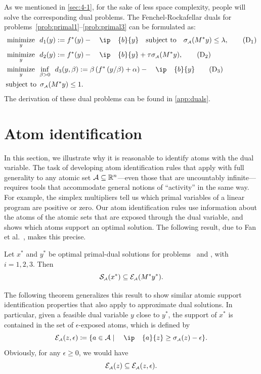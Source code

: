 As we mentioned in \autoref{sec:4-1}, for the sake of less space complexity, people will solve the corresponding dual problems. The Fenchel-Rockafellar duals for problems~\eqref{prob:primal1}--\eqref{prob:primal3} can be formulated as:
\begin{align} 
  & \minimize{y}  d_1(y) := f^*(y) - \ip{b}{y} \text{subject to} \sigma\As(M^*y) \leq \lambda, \label{prob:dual1} \tag{D$_1$}\\
  & \minimize{y} d_2(y) := f^*(y) - \ip{b}{y} + \tau\sigma\As(M^*y), \label{prob:dual2} \tag{D$_2$}\\
  & \minimize{y} \inf_{\beta > 0} \enspace d_3(y, \beta)
    := \beta \left(
      f^*\left( y/\beta \right) + \alpha
    \right) - \ip{b}{y} \label{prob:dual3} \tag{D$_3$}\\
  & \mbox{subject to}\enspace \sigma\As(M^* y) \leq 1. \nonumber
\end{align}
The derivation of these dual problems can be found in \autoref{app:duals}. 

\section{Atom identification} \label{sec:atom_iden}

In this section, we illustrate why it is reasonable to identify atoms with the dual variable. The task of developing atom identification rules that apply with full generality to any atomic set $\mathcal{A}\subseteq\mathbb{R}^n$---even those that are uncountably infinite---requires tools that accommodate general notions of ``activity'' in
the same way. For example, the simplex multipliers tell us which primal
variables of a linear program are positive or zero. Our atom identification rules use information about the atoms of the atomic sets that are exposed through the dual variable, and shows which atoms support an optimal solution. The following
result, due to Fan et al.~\cite[Proposition~4.5 and Theorem~5.1]{fan2019alignment}, makes this precise.
\begin{theorem}\label{thm:opt_supp_id} Let
  $x^*$ and $ y^*$ be optimal primal-dual solutions for problems \Probi~and \Drobi, with
  $i=1,2,3$. Then
  \[\operatorname{\mathcal{S}_{\scriptscriptstyle\mathcal{A}}}(x^*) \subseteq \mathcal{E}_{\scriptscriptstyle\mathcal{A}}(M^*y^*). \]
\end{theorem}

The following theorem generalizes this result to show similar atomic support identification properties that also apply to approximate dual solutions. In particular, given a feasible dual variable $y$ close to $y^*$, the support of $x^*$ is contained in the set of $\epsilon$-exposed atoms, which is defined by
\begin{equation}
  \Escr\As(z, \epsilon) \coloneqq \{a\in\Ascr \mid \ip{a}{z} \geq \sigma\As(z) - \epsilon\}.
\end{equation}
Obviously, for any $\epsilon \geq 0$, we would have 
\[\mathcal{E}_{\scriptscriptstyle\mathcal{A}}(z) \subseteq \mathcal{E}_{\scriptscriptstyle\mathcal{A}}(z, \epsilon).\]

